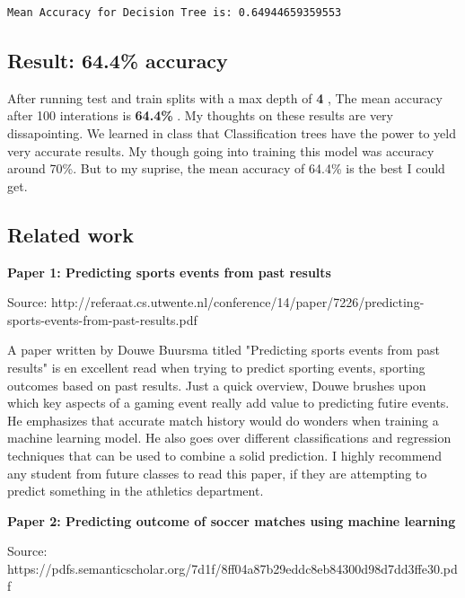 \documentclass[11pt]{article}
\begin{document}
    \begin{Verbatim}[commandchars=\\\{\}]
Mean Accuracy for Decision Tree is: 0.64944659359553

    \end{Verbatim}

    \subsection{Result: 64.4\% accuracy}\label{result-64.4-accuracy}

After running test and train splits with a max depth of \textbf{4} , The
mean accuracy after 100 interations is \textbf{64.4\%} . My thoughts on
these results are very dissapointing. We learned in class that
Classification trees have the power to yeld very accurate results. My
though going into training this model was accuracy around 70\%. But to
my suprise, the mean accuracy of 64.4\% is the best I could get.

    \subsection{Related work}\label{related-work}

\textbf{Paper 1: Predicting sports events from past results} \newline

Source:
http://referaat.cs.utwente.nl/conference/14/paper/7226/predicting-sports-events-from-past-results.pdf

A paper written by Douwe Buursma titled "Predicting sports events from
past results" is en excellent read when trying to predict sporting
events, sporting outcomes based on past results. Just a quick overview,
Douwe brushes upon which key aspects of a gaming event really add value
to predicting futire events. He emphasizes that accurate match history
would do wonders when training a machine learning model. He also goes
over different classifications and regression techniques that can be
used to combine a solid prediction. I highly recommend any student from
future classes to read this paper, if they are attempting to predict
something in the athletics department. \newline

\textbf{Paper 2: Predicting outcome of soccer matches using machine
learning} \newline

Source:
https://pdfs.semanticscholar.org/7d1f/8ff04a87b29eddc8eb84300d98d7dd3ffe30.pdf
\end{document}
